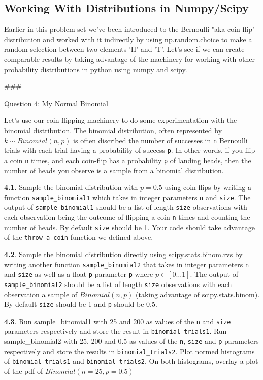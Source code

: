 \documentclass[11pt]{article}
\begin{document}
    \subsection{Working With Distributions in
Numpy/Scipy}\label{working-with-distributions-in-numpyscipy}

Earlier in this problem set we've been introduced to the Bernoulli "aka
coin-flip" distribution and worked with it indirectly by using
np.random.choice to make a random selection between two elements 'H' and
'T'. Let's see if we can create comparable results by taking advantage
of the machinery for working with other probability distributions in
python using numpy and scipy.

    \#\#\#

Question 4: My Normal Binomial

Let's use our coin-flipping machinery to do some experimentation with
the binomial distribution. The binomial distribution, often represented
by \(k \sim Binomial(n, p)\) is often discribed the number of successes
in \texttt{n} Bernoulli trials with each trial having a probability of
success \texttt{p}. In other words, if you flip a coin \texttt{n} times,
and each coin-flip has a probability \texttt{p} of landing heads, then
the number of heads you observe is a sample from a binomial
distribution.

\textbf{4.1}. Sample the binomial distribution with \(p = 0.5\) using
coin flips by writing a function \texttt{sample\_binomial1} which takes
in integer parameters \texttt{n} and \texttt{size}. The output of
\texttt{sample\_binomial1} should be a list of length \texttt{size}
observations with each observation being the outcome of flipping a coin
\texttt{n} times and counting the number of heads. By default
\texttt{size} should be 1. Your code should take advantage of the
\texttt{throw\_a\_coin} function we defined above.

\textbf{4.2}. Sample the binomial distribution directly using
scipy.stats.binom.rvs by writing another function
\texttt{sample\_binomial2} that takes in integer parameters \texttt{n}
and \texttt{size} as well as a float \texttt{p} parameter \texttt{p}
where \(p \in [0 \ldots 1]\). The output of \texttt{sample\_binomial2}
should be a list of length \texttt{size} observations with each
observation a sample of \(Binomial(n, p)\) (taking advantage of
scipy.stats.binom). By default \texttt{size} should be 1 and \texttt{p}
should be 0.5.

\textbf{4.3}. Run sample\_binomial1 with 25 and 200 as values of the
\texttt{n} and \texttt{size} parameters respectively and store the
result in \texttt{binomial\_trials1}. Run sample\_binomial2 with 25, 200
and 0.5 as values of the \texttt{n}, \texttt{size} and \texttt{p}
parameters respectively and store the results in
\texttt{binomial\_trials2}. Plot normed histograms of
\texttt{binomial\_trials1} and \texttt{binomial\_trials2}. On both
histograms, overlay a plot of the pdf of \(Binomial(n=25, p=0.5)\)
\end{document}
